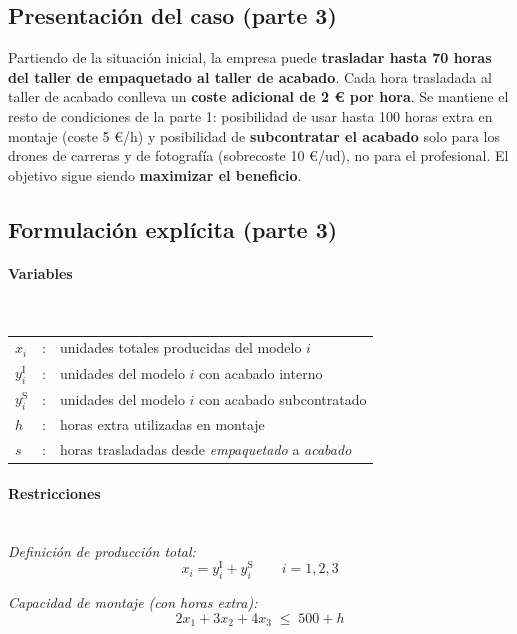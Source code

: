 \subsection{Presentación del caso (parte 3)}

Partiendo de la situación inicial, la empresa puede \textbf{trasladar hasta 70 horas del taller de empaquetado al taller de acabado}. Cada hora trasladada al taller de acabado conlleva un \textbf{coste adicional de 2 € por hora}. Se mantiene el resto de condiciones de la parte 1: posibilidad de usar hasta 100 horas extra en montaje (coste 5 €/h) y posibilidad de \textbf{subcontratar el acabado} solo para los drones de carreras y de fotografía (sobrecoste 10 €/ud), no para el profesional. El objetivo sigue siendo \textbf{maximizar el beneficio}.


\subsection{Formulación explícita (parte 3)}

\paragraph{Variables}\mbox{}\\
\begin{tabular}{lcl}
$x_i$ & : & unidades totales producidas del modelo $i$ \\
$y_i^{\mathrm{I}}$ & : & unidades del modelo $i$ con acabado interno \\
$y_i^{\mathrm{S}}$ & : & unidades del modelo $i$ con acabado subcontratado \\
$h$      & : & horas extra utilizadas en montaje \\
$s$      & : & horas trasladadas desde \emph{empaquetado} a \emph{acabado} \\
\end{tabular}

\paragraph{Restricciones}\mbox{}\\
\textit{Definición de producción total:}
\begin{equation}
x_i = y_i^{\mathrm{I}} + y_i^{\mathrm{S}} \qquad i=1,2,3
\end{equation}

\textit{Capacidad de montaje (con horas extra):}
\begin{equation}
2x_1 + 3x_2 + 4x_3 \;\leq\; 500 + h
\end{equation}

